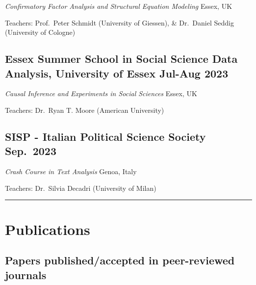 \documentclass[10pt,]{article}
\providecommand{\tightlist}{%
  \setlength{\itemsep}{0pt}\setlength{\parskip}{0pt}}
\renewenvironment{itemize}{
  \begin{list}{}{
    \setlength{\leftmargin}{1.5em}
  }
}{
  \end{list}
}
\begin{document}
\begin{itemize}
\tightlist
\item
  \emph{Confirmatory Factor Analysis and Structural Equation Modeling}
  \hfill Essex, UK
\item
  Teachers: Prof.~Peter Schmidt (University of Giessen), \& Dr.~Daniel
  Seddig (University of Cologne)
\end{itemize}

\subsection{\texorpdfstring{Essex Summer School in Social Science Data
Analysis, University of Essex \hfill  Jul-Aug
2023}{Essex Summer School in Social Science Data Analysis, University of Essex Jul-Aug 2023}}\label{essex-summer-school-in-social-science-data-analysis-university-of-essex-jul-aug-2023-1}

\begin{itemize}
\tightlist
\item
  \emph{Causal Inference and Experiments in Social Sciences}
  \hfill Essex, UK
\item
  Teachers: Dr.~Ryan T. Moore (American University)
\end{itemize}

\subsection{\texorpdfstring{SISP - Italian Political Science Society
\hfill  Sep.~2023}{SISP - Italian Political Science Society Sep.~2023}}\label{sisp---italian-political-science-society-sep.-2023}

\begin{itemize}
\item
  \emph{Crash Course in Text Analysis} \hfill Genoa, Italy
\item
  Teachers: Dr.~Silvia Decadri (University of Milan)

  \bigskip \hrule
\end{itemize}

\section{Publications}\label{publications}

\subsection{Papers published/accepted in peer-reviewed
journals}\label{papers-publishedaccepted-in-peer-reviewed-journals}
\end{document}
